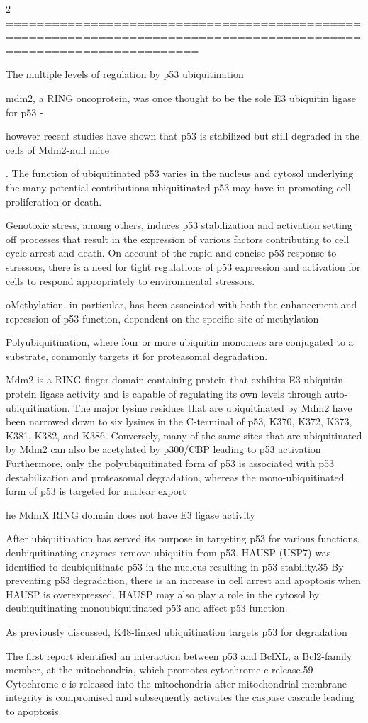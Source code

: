 2 
=====================================================================================================================

The multiple levels of regulation by p53 ubiquitination


mdm2, a RING oncoprotein, was once thought to be the sole E3 ubiquitin ligase for p53 - 

however recent studies have shown that p53 is stabilized but still degraded in the cells of Mdm2-null mice

. The function of ubiquitinated p53 varies in the nucleus and cytosol underlying the many potential contributions ubiquitinated p53 may have in promoting cell proliferation or death.



Genotoxic stress, among others, induces p53 stabilization and activation setting off processes that result in the expression of various factors contributing to cell cycle arrest and death. On account of the rapid and concise p53 response to stressors, there is a need for tight regulations of p53 expression and activation for cells to respond appropriately to environmental stressors.


oMethylation, in particular, has been associated with both the enhancement and repression of p53 function, dependent on the speciﬁc site of methylation

 Polyubiquitination, where four or more ubiquitin monomers are conjugated to a substrate, commonly targets it for proteasomal degradation.

  Mdm2 is a RING ﬁnger domain containing protein that exhibits E3 ubiquitin-protein ligase activity and is capable of regulating its own levels through auto-ubiquitination.
   The major lysine residues that are ubiquitinated by Mdm2 have been narrowed down to six lysines in the C-terminal of p53, K370, K372, K373, K381, K382, and K386.
   Conversely, many of the same sites that are ubiquitinated by Mdm2 can also be acetylated by p300/CBP leading to p53 activation
   Furthermore, only the polyubiquitinated form of p53 is associated with p53 destabilization and proteasomal degradation, whereas the mono-ubiquitinated form of p53 is targeted for nuclear export


   he MdmX RING domain does not have E3 ligase activity

   After ubiquitination has served its purpose in targeting p53 for various functions, deubiquitinating enzymes remove ubiquitin from p53. HAUSP (USP7) was identiﬁed to deubiquitinate p53 in the nucleus resulting in p53 stability.35 By preventing p53 degradation, there is an increase in cell arrest and apoptosis when HAUSP is overexpressed. HAUSP may also play a role in the cytosol by deubiquitinating monoubiquitinated p53 and affect p53 function.

 As previously discussed, K48-linked ubiquitination targets p53 for degradation

The ﬁrst report identiﬁed an interaction between p53 and BclXL, a Bcl2-family member, at the mitochondria, which promotes cytochrome c release.59 Cytochrome c is released into the mitochondria after mitochondrial membrane integrity is compromised and subsequently activates the caspase cascade leading to apoptosis.

